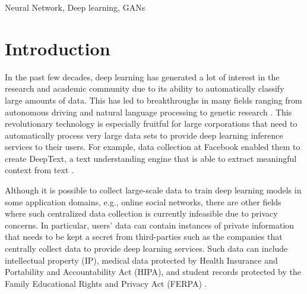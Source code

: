 \documentclass[conference]{IEEEtran}
\begin{document}
\begin{IEEEkeywords}
Neural Network, Deep learning, GANs
\end{IEEEkeywords}

\section{Introduction}
In the past few decades, deep learning has generated a lot of interest in the research and academic community due to its ability
to automatically classify large amounts of data. This has led to breakthroughs in many fields ranging
from autonomous driving and natural language processing to genetic research 
\cite{young2018recent, al2017deep, huval2015empirical, danaee2017deep}.
This revolutionary technology is especially fruitful for large corporations that need to automatically process very large data sets to
provide deep learning inference services to their users. For example, data collection at Facebook enabled them to create DeepText, a
text understanding engine that is able to extract meaningful context from text \cite{abdulkader2016introducing}.

Although it is possible to collect large-scale data to train deep learning models in some application domains, e.g., online social
networks, there are other fields where such centralized data collection is currently infeasible due to privacy
concerns. In particular, users' data can contain instances of private information that needs to be kept a secret from third-parties
such as the companies that centrally collect data to provide deep learning services. Such data
can include
intellectual property (IP), 
medical data protected by Health Insurance and Portability and Accountability Act (HIPA), and student records protected by the Family
Educational Rights and Privacy Act (FERPA) \cite{act1996health,blechner2002health,shultz2015your}. 
\end{document}
